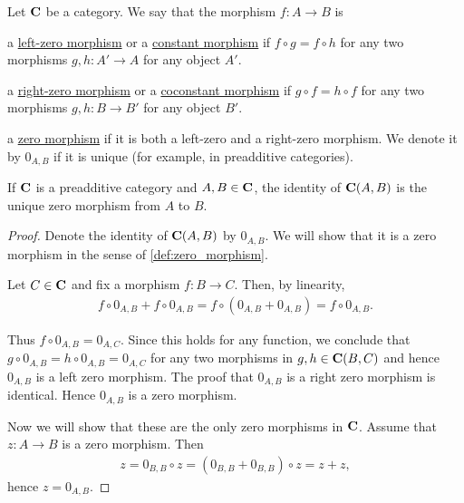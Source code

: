 \begin{definition}\label{def:zero_morphism}
  Let $\operatorname{\mathbf{C}}$ be a category. We say that the morphism $f: A \to B$ is
  \begin{defenum}
    \item\label{def:zero_morphism/left} a \uline{left-zero morphism} or a \uline{constant morphism} if $f \circ g = f \circ h$ for any two morphisms $g, h: A' \to A$ for any object $A'$.
    \item\label{def:zero_morphism/right} a \uline{right-zero morphism} or a \uline{coconstant morphism} if $g \circ f = h \circ f$ for any two morphisms $g, h: B \to B'$ for any object $B'$.
    \item\label{def:zero_morphism/bidirectional} a \uline{zero morphism} if it is both a left-zero and a right-zero morphism. We denote it by $0_{A,B}$ if it is unique (for example, in preadditive categories).
  \end{defenum}
\end{definition}

\begin{proposition}\label{def:preadditive_zero_morphisms}
  If $\operatorname{\mathbf{C}}$ is a preadditive category and $A, B \in \operatorname{\mathbf{C}}$, the identity of $\operatorname{\mathbf{C}}(A, B)$ is the unique zero morphism from $A$ to $B$.
\end{proposition}
\begin{proof}
  Denote the identity of $\operatorname{\mathbf{C}}(A, B)$ by $0_{A,B}$. We will show that it is a zero morphism in the sense of \cref{def:zero_morphism}.

  Let $C \in \operatorname{\mathbf{C}}$ and fix a morphism $f: B \to C$. Then, by linearity,
  \begin{align*}
    f \circ 0_{A,B} + f \circ 0_{A,B}
    =
    f \circ (0_{A,B} + 0_{A,B})
    =
    f \circ 0_{A,B}.
  \end{align*}

  Thus $f \circ 0_{A,B} = 0_{A,C}$. Since this holds for any function, we conclude that $g \circ 0_{A,B} = h \circ 0_{A,B} = 0_{A,C}$ for any two morphisms in $g, h \in \operatorname{\mathbf{C}}(B,C)$ and hence $0_{A,B}$ is a left zero morphism. The proof that $0_{A,B}$ is a right zero morphism is identical. Hence $0_{A,B}$ is a zero morphism.

  Now we will show that these are the only zero morphisms in $\operatorname{\mathbf{C}}$. Assume that $z: A \to B$ is a zero morphism. Then
  \begin{align*}
    z = 0_{B,B} \circ z = (0_{B,B} + 0_{B,B}) \circ z = z + z,
  \end{align*}
  hence $z = 0_{A,B}$.
\end{proof}

